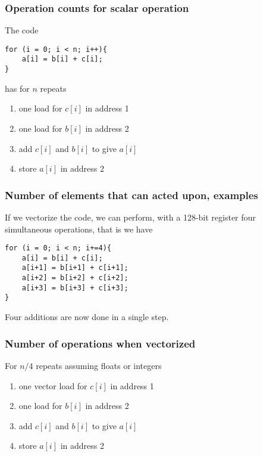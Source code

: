 \documentclass{beamer}
\begin{document}
\begin{frame}
\frametitle{Operation counts for scalar operation}

The code




\begin{verbatim}
for (i = 0; i < n; i++){
    a[i] = b[i] + c[i];
}

\end{verbatim}

has for $n$ repeats
\begin{enumerate}
\item one load for $c[i]$ in address 1

\item one load for $b[i]$ in address 2

\item add $c[i]$ and $b[i]$ to give $a[i]$

\item store $a[i]$ in address 2
\end{enumerate}

\noindent
\end{frame}

\begin{frame}
\frametitle{Number of elements that can acted upon, examples}

If we vectorize the code, we can perform, with a 128-bit register four simultaneous operations, that is
we have







\begin{verbatim}
for (i = 0; i < n; i+=4){
    a[i] = b[i] + c[i];
    a[i+1] = b[i+1] + c[i+1];
    a[i+2] = b[i+2] + c[i+2];
    a[i+3] = b[i+3] + c[i+3];
}

\end{verbatim}


Four additions are now done in a single step.
\end{frame}

\begin{frame}
\frametitle{Number of operations when vectorized}

For $n/4$ repeats assuming floats or integers
\begin{enumerate}
\item one vector load for $c[i]$ in address 1

\item one load for $b[i]$ in address 2

\item add $c[i]$ and $b[i]$ to give $a[i]$

\item store $a[i]$ in address 2
\end{enumerate}

\noindent
\end{frame}
\end{document}
